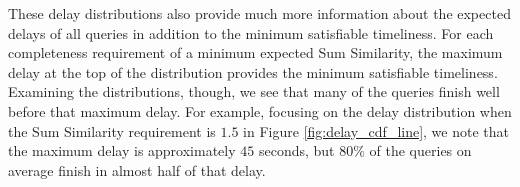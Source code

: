 These delay distributions also provide much more information about the expected delays of all queries in addition to the minimum satisfiable timeliness.  For each completeness requirement of a minimum expected Sum Similarity, the maximum delay at the top of the distribution provides the minimum satisfiable timeliness.  Examining the distributions, though, we see that many of the queries finish well before that maximum delay.  For example, focusing on the delay distribution when the Sum Similarity requirement is $1.5$ in Figure \ref{fig:delay_cdf_line}, we note that the maximum delay is approximately $45$ seconds, but $80\%$ of the queries on average finish in almost half of that delay.  





